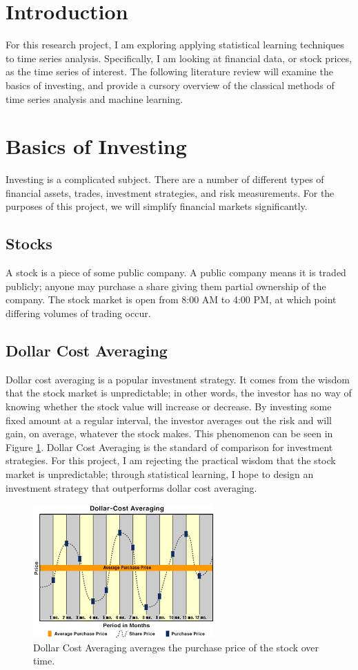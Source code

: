 \documentclass[12pt]{article}
\begin{document}
\tableofcontents
\newpage 
\section{Introduction}
For this research project, I am exploring applying statistical learning techniques to time series analysis. Specifically, I am looking at financial data, or stock prices, as the time series of interest. The following literature review will examine the basics of investing, and provide a cursory overview of the classical methods of time series analysis and machine learning.

\section{Basics of Investing}
Investing is a complicated subject. There are a number of different types of financial assets, trades, investment strategies, and risk measurements. For the purposes of this project, we will simplify financial markets significantly. 

\subsection{Stocks}
A stock is a piece of some public company. A public company means it is traded publicly; anyone may purchase a share giving them partial ownership of the company. The stock market is open from 8:00 AM to 4:00 PM, at which point differing volumes of trading occur. 

\subsection{Dollar Cost Averaging}
Dollar cost averaging is a popular investment strategy. It comes from the wisdom that the stock market is unpredictable; in other words, the investor has no way of knowing whether the stock value will increase or decrease. By investing some fixed amount at a regular interval, the investor averages out the risk and will gain, on average, whatever the stock makes. This phenomenon can be seen in Figure \ref{dca}. Dollar Cost Averaging is the standard of comparison for investment strategies. For this project, I am rejecting the practical wisdom that the stock market is unpredictable; through statistical learning, I hope to design an investment strategy that outperforms dollar cost averaging.

\begin{figure}[ht]
	\centering
	\includegraphics[width=.5\textwidth]{dca.png}
	\caption{Dollar Cost Averaging averages the purchase price of the stock over time. \cite{dca}}
	\label{dca}
\end{figure}
\end{document}
